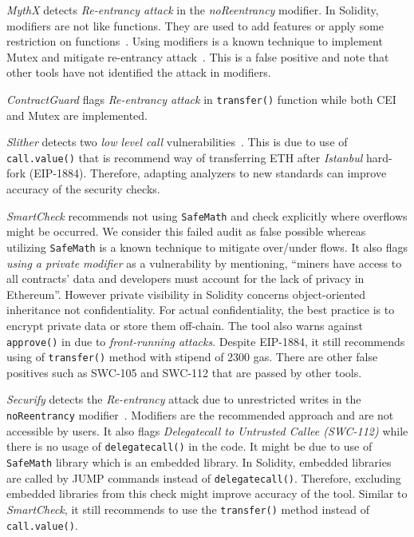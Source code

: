 \textit{MythX} detects \textit{Re-entrancy attack} in the \textit{noReentrancy} modifier. In Solidity, modifiers are not like functions. They are used to add features or apply some restriction on functions~\cite{SolidityModifer}. Using modifiers is a known technique to implement Mutex and mitigate re-entrancy attack~\cite{ReentrancyGuard}. This is a false positive and note that other tools have not identified the attack in modifiers.

\textit{ContractGuard} flags \textit{Re-entrancy attack} in \texttt{transfer()} function while both CEI and Mutex are implemented.

\textit{Slither} detects two \textit{low level call} vulnerabilities~\cite{SlitherSetup}. This is due to use of \texttt{call.value()} that is recommend way of transferring ETH after \textit{Istanbul} hard-fork (EIP-1884).	Therefore, adapting analyzers to new standards can improve accuracy of the security checks.

\textit{SmartCheck} recommends not using \texttt{SafeMath} and check explicitly where overflows might be occurred. We consider this failed audit as false possible whereas utilizing \texttt{SafeMath} is a known technique to mitigate over/under flows. It also flags \textit{using a private modifier} as a vulnerability by mentioning, ``miners have access to all contracts' data and developers must account for the lack of privacy in Ethereum''. However private visibility in Solidity concerns object-oriented inheritance not confidentiality. For actual confidentiality, the best practice is to encrypt private data or store them off-chain. The tool also warns against \texttt{approve()} in \erc due to \textit{front-running attacks}. Despite EIP-1884, it still recommends using of \texttt{transfer()} method with stipend of 2300 gas. There are other false positives such as SWC-105 and SWC-112 that are passed by other tools.

\textit{Securify} detects the \textit{Re-entrancy} attack due to unrestricted writes in the \texttt{noReentrancy} modifier~\cite{SECURIFY}. Modifiers are the recommended approach and are not accessible by users. It also flags \textit{Delegatecall to Untrusted Callee (SWC-112)} while there is no usage of \texttt{delegatecall()} in the code. It might be due to use of \texttt{SafeMath} library which is an embedded library. In Solidity, embedded libraries are called by JUMP commands instead of \texttt{delegatecall()}. Therefore, excluding embedded libraries from this check might improve accuracy of the tool. Similar to \textit{SmartCheck}, it still recommends to use the \texttt{transfer()} method instead of \texttt{call.value()}.

